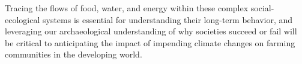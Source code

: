 \documentclass[fleqn,10pt]{wlscirep}
\begin{document}
Tracing the flows of food, water, and energy within these complex social-ecological systems is essential for understanding their long-term behavior, and leveraging our archaeological understanding of why societies succeed or fail will be critical to anticipating the impact of impending climate changes on farming communities in the developing world.






\end{document}

